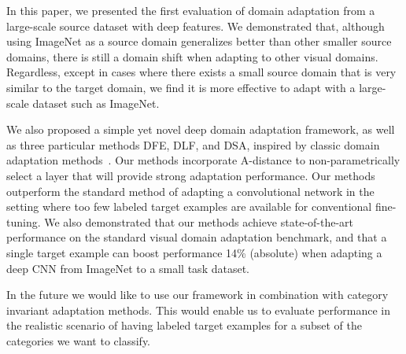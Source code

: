 In this paper, we presented the first evaluation of domain adaptation from a
large-scale source dataset with deep features. We demonstrated that, although
using ImageNet as a source domain generalizes better than other smaller source
domains, there is still a domain shift when adapting to other visual domains.
Regardless, except in cases where there exists a small source domain that is
very similar to the target domain, we find it is more effective to adapt with
a large-scale dataset such as ImageNet.

We also proposed a simple yet novel deep domain adaptation framework, as well as
three particular methods DFE, DLF, and DSA, inspired by classic domain
adaptation methods~\cite{daume, sa}. Our methods incorporate A-distance to
non-parametrically select a layer that will provide strong adaptation
performance. Our methods outperform the standard method of adapting a
convolutional network in the setting where too few labeled target examples are
available for conventional fine-tuning. We also demonstrated that our methods
achieve state-of-the-art performance on the standard visual domain adaptation
benchmark, and that a single target example can boost performance 14\% (absolute) when
adapting a deep CNN from ImageNet to a small task dataset.

In the future we would like to use our framework in combination with category invariant adaptation methods. This would enable us to evaluate performance in the realistic scenario of having labeled target examples for a subset of the categories we want to classify. 
